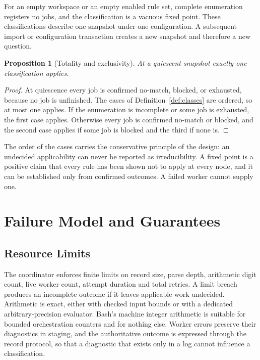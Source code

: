 \documentclass[11pt,a4paper]{article}
\theoremstyle{plain}
\newtheorem{proposition}[theorem]{Proposition}
\theoremstyle{definition}
\theoremstyle{remark}
\theoremstyle{definition}
\begin{document}
For an empty workspace or an empty enabled rule set, complete enumeration registers no jobs, and the classification is a vacuous fixed point. These classifications describe one snapshot under one configuration. A subsequent import or configuration transaction creates a new snapshot and therefore a new question.

\begin{proposition}[Totality and exclusivity]
\label{prop:classes}
At a quiescent snapshot exactly one classification applies.
\end{proposition}

\begin{proof}
At quiescence every job is confirmed no-match, blocked, or exhausted, because no job is unfinished. The cases of Definition~\ref{def:classes} are ordered, so at most one applies. If the enumeration is incomplete or some job is exhausted, the first case applies. Otherwise every job is confirmed no-match or blocked, and the second case applies if some job is blocked and the third if none is.
\end{proof}

The order of the cases carries the conservative principle of the design: an undecided applicability can never be reported as irreducibility. A fixed point is a positive claim that every rule has been shown not to apply at every node, and it can be established only from confirmed outcomes. A failed worker cannot supply one.

\section{Failure Model and Guarantees}
\label{sec:failure}

\subsection{Resource Limits}

The coordinator enforces finite limits on record size, parse depth, arithmetic digit count, live worker count, attempt duration and total retries. A limit breach produces an incomplete outcome if it leaves applicable work undecided. Arithmetic is exact, either with checked input bounds or with a dedicated arbitrary-precision evaluator. Bash's machine integer arithmetic is suitable for bounded orchestration counters and for nothing else. Worker errors preserve their diagnostics in staging, and the authoritative outcome is expressed through the record protocol, so that a diagnostic that exists only in a log cannot influence a classification.
\end{document}
